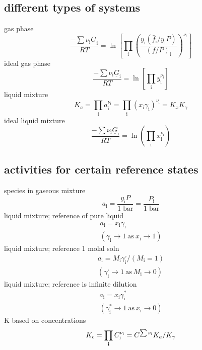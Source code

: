 \documentclass{article}
\begin{document}
\subsection*{different types of systems}
gas phase
\[
{\frac{-\sum\nu_{\mathrm{i}} \underline G_{\mathrm{i}}}{R T}}=\ln\left[\prod_{\mathrm{i}}\left({\frac{y_{\mathrm{i}}({\bar{f}}_{\mathrm{i}}/y_{\mathrm{i}}P)}{(f/P)_{\mathrm{i}}}}\right)^{\nu_{\mathrm{i}}}\right]
\]
ideal gas phase
\[
{\frac{-\sum\nu_{\mathrm{i}} \underline G_{\mathrm{i}}}{R T}}=\ln\left[\prod_{\mathrm{i}}y_{\mathrm{i}}^{\nu_{\mathrm{i}}}\right]
\]
liquid mixture
\[
K_{a}=\prod_{\mathrm{i}}a_{\mathrm{i}}^{\nu_{\mathrm{i}}}=\prod_{\mathrm{i}}(x_{\mathrm{i}}\gamma_{\mathrm{i}})^{\nu_{\mathrm{i}}}=K_{x}K_{\gamma}
\]
ideal liquid mixture
\[
{\frac{-\sum\nu_{\mathrm{i}}\underline{G}_{\mathrm{i}}}{R T}}=\ln\left(\prod_{\mathrm{i}}x_{\mathrm{i}}^{\nu_{\mathrm{i}}}\right)
\]
\subsection*{activities for certain reference states}
species in gaseous mixture
\[
a_{\mathrm{i}}={\frac{y_{\mathrm{i}}P}{1\;\mathrm{bar}}}={\frac{P_{\mathrm{i}}}{1\;\mathrm{bar}}}
\]
liquid mixture; reference of pure liquid
\[
\begin{array}{c}{{a_{\mathrm{i}}=x_{\mathrm{i}}\gamma_{\mathrm{i}}}}\\ {{(\gamma_{\mathrm{i}}\to1\mathrm{~as~}x_{\mathrm{i}}\to1)}}\end{array}
\]
liquid mixture; reference 1 molal soln
\[
\begin{array}{c}{{a_{\mathrm{i}}=M_{\mathrm{i}}\gamma_{\mathrm{i}}^{\square}/(M_{\mathrm{i}}=1)}}\\ {{(\gamma_{\mathrm{i}}^{\square}\to1\mathrm{~as~}M_{\mathrm{i}}\to0)}}\end{array}
\]
liquid mixture; reference is infinite dilution
\[
\begin{array}{l}{{a_{\mathrm{i}}=x_{\mathrm{i}}\gamma_{\mathrm{i}}^{*}}}\\ {{\left(\gamma_{\mathrm{i}}^{*}\longrightarrow1\mathrm{~as~}x_{\mathrm{i}}\rightarrow0\right)}}\end{array}
\]
K based on concentrations
\[
K_{c}=\prod_{\mathrm{\bf{i}}}C_{\mathrm{i}}^{\nu_{\mathrm{i}}}=C^{\sum\nu_{\mathrm{i}}}K_{a}/K_{\gamma}
\]
\end{document}
